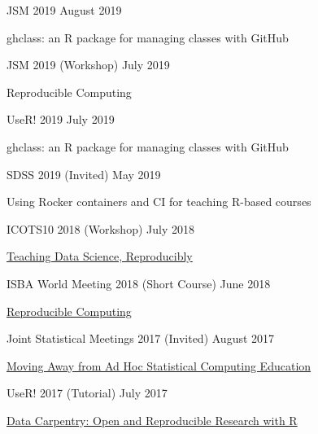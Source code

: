 \documentclass[margin,line]{res}
\begin{document}
\begin{resume}
JSM 2019 \hfill August 2019
\begin{list1}
\item[] ghclass: an R package for managing classes with GitHub
\end{list1}
\vspace{-3mm}

JSM 2019 (Workshop) \hfill July 2019
\begin{list1}
\item[] Reproducible Computing
\end{list1}
\vspace{-3mm}


UseR! 2019 \hfill July 2019
\begin{list1}
\item[] ghclass: an R package for managing classes with GitHub
\end{list1}
\vspace{-3mm}

SDSS 2019 (Invited) \hfill May 2019
\begin{list1}
\item[] Using Rocker containers and CI for teaching R-based courses
\end{list1}
\vspace{-3mm}

ICOTS10 2018 (Workshop) \hfill July 2018
\begin{list1}
\item[] \href{https://mine-cetinkaya-rundel.github.io/teach-data-sci-icots2018/}{Teaching Data Science, Reproducibly}
\end{list1}
\vspace{-3mm}

ISBA World Meeting 2018 (Short Course) \hfill June 2018
\begin{list1}
\item[] \href{https://mine-cetinkaya-rundel.github.io/repro-compute-isba18/}{Reproducible Computing}
\end{list1}
\vspace{-3mm}

Joint Statistical Meetings 2017 (Invited) \hfill August 2017
\begin{list1}
\item[] \href{https://github.com/rundel/Presentations/tree/master/JSM%202017}{Moving Away from Ad Hoc Statistical Computing Education}
\end{list1}
\vspace{-3mm}

UseR! 2017 (Tutorial) \hfill July 2017
\begin{list1}
\item[] \href{https://github.com/fmichonneau/2017-useR-reproducibility/}{Data Carpentry: Open and Reproducible Research with R}
\end{list1}
\vspace{-3mm}


\end{resume}
\end{document}
